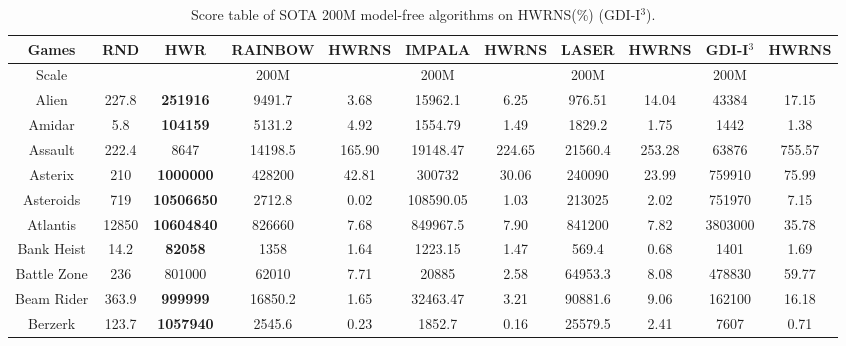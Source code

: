 \documentclass[nohyperref]{article}
\theoremstyle{plain}
\begin{document}
\begin{table}[!hb]
\footnotesize
\begin{center}
\caption{Score table of SOTA 200M model-free algorithms on HWRNS(\%)  (GDI-I$^3$).}
\setlength{\tabcolsep}{1.0pt}
\begin{tabular}{|c| c| c| c c| c c| c c| c c| }
\hline
Games               & RND       & HWR       & RAINBOW  & HWRNS & IMPALA  & HWRNS & LASER  & HWRNS & GDI-I$^3$ & HWRNS  \\
\hline
Scale               &           &           & 200M     &           &  200M   &            & 200M    &           &  200M    &            \\
\hline
 Alien              & 227.8     & \textbf{251916}    & 9491.7   &3.68    & 15962.1    & 6.25       & 976.51  & 14.04     &43384             &17.15     \\
 Amidar             & 5.8       & \textbf{104159}    & 5131.2   &4.92    & 1554.79    & 1.49       & 1829.2  & 1.75      &1442              &1.38           \\
 Assault            & 222.4     & 8647             & 14198.5  &165.90  & 19148.47   & 224.65     & 21560.4 & 253.28    &63876        &755.57  \\
 Asterix            & 210       & \textbf{1000000}   & 428200   &42.81   & 300732     & 30.06      & 240090  & 23.99     &759910            &75.99   \\
 Asteroids          & 719       & \textbf{10506650}  & 2712.8   &0.02    & 108590.05  & 1.03       & 213025  & 2.02      &751970            &7.15   \\
 Atlantis           & 12850     & \textbf{10604840}  & 826660   &7.68    & 849967.5   & 7.90       & 841200  & 7.82      &3803000           &35.78  \\
 Bank Heist         & 14.2      & \textbf{82058}     & 1358     &1.64    & 1223.15    & 1.47       & 569.4   & 0.68      &1401              &1.69    \\
 Battle Zone        & 236       & 801000    & 62010    &7.71    & 20885      & 2.58       & 64953.3 & 8.08      &478830            &59.77 \\
 Beam Rider         & 363.9     & \textbf{999999}    & 16850.2  &1.65    & 32463.47   & 3.21       & 90881.6 & 9.06      &162100            &16.18    \\
 Berzerk            & 123.7     & \textbf{1057940}   & 2545.6   &0.23    & 1852.7     & 0.16       & 25579.5 & 2.41      &7607                       &0.71            \\

\end{tabular}
\end{center}
\end{table}
\end{document}
